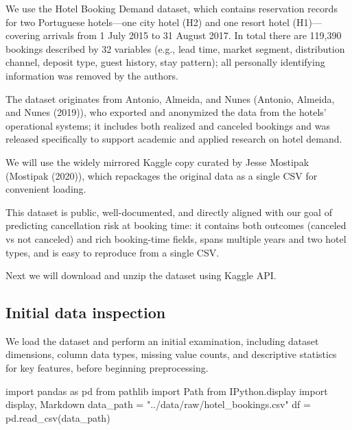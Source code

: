 \documentclass[
  letterpaper,
  DIV=11,
  numbers=noendperiod]{scrartcl}
\newenvironment{Shaded}{\begin{snugshade}}{\end{snugshade}}
\newcommand{\ImportTok}[1]{\textcolor[rgb]{0.00,0.46,0.62}{#1}}
\newcommand{\NormalTok}[1]{\textcolor[rgb]{0.00,0.23,0.31}{#1}}
\newcommand{\OperatorTok}[1]{\textcolor[rgb]{0.37,0.37,0.37}{#1}}
\newcommand{\StringTok}[1]{\textcolor[rgb]{0.13,0.47,0.30}{#1}}
\renewenvironment{Shaded}{%
  \begin{tcolorbox}[%
    enhanced,%
    colback=codebg,%
    colframe=codebg,%
    borderline west={3pt}{0pt}{sectionblue},%
    fontupper=\small\ttfamily,%
    boxrule=0pt,%
    arc=0pt,%
    boxsep=5pt,%
    left=2mm,%
    right=2mm,%
    top=2mm,%
    bottom=2mm%
  ]%
}{%
  \end{tcolorbox}%
}
\begin{document}
We use the Hotel Booking Demand dataset, which contains reservation
records for two Portuguese hotels---one city hotel (H2) and one resort
hotel (H1)---covering arrivals from 1 July 2015 to 31 August 2017. In
total there are 119,390 bookings described by 32 variables (e.g., lead
time, market segment, distribution channel, deposit type, guest history,
stay pattern); all personally identifying information was removed by the
authors.

The dataset originates from Antonio, Almeida, and Nunes (Antonio,
Almeida, and Nunes (2019)), who exported and anonymized the data from
the hotels' operational systems; it includes both realized and canceled
bookings and was released specifically to support academic and applied
research on hotel demand.

We will use the widely mirrored Kaggle copy curated by Jesse Mostipak
(Mostipak (2020)), which repackages the original data as a single CSV
for convenient loading.

This dataset is public, well-documented, and directly aligned with our
goal of predicting cancellation risk at booking time: it contains both
outcomes (canceled vs not canceled) and rich booking-time fields, spans
multiple years and two hotel types, and is easy to reproduce from a
single CSV.

Next we will download and unzip the dataset using Kaggle API.

\subsection{Initial data inspection}\label{initial-data-inspection}

We load the dataset and perform an initial examination, including
dataset dimensions, column data types, missing value counts, and
descriptive statistics for key features, before beginning preprocessing.

\begin{Shaded}
\begin{Highlighting}[]
\ImportTok{import}\NormalTok{ pandas }\ImportTok{as}\NormalTok{ pd}
\ImportTok{from}\NormalTok{ pathlib }\ImportTok{import}\NormalTok{ Path}
\ImportTok{from}\NormalTok{ IPython.display }\ImportTok{import}\NormalTok{ display, Markdown}
\NormalTok{data\_path }\OperatorTok{=} \StringTok{"../data/raw/hotel\_bookings.csv"}
\NormalTok{df }\OperatorTok{=}\NormalTok{ pd.read\_csv(data\_path)}
\end{Highlighting}
\end{Shaded}
\end{document}
